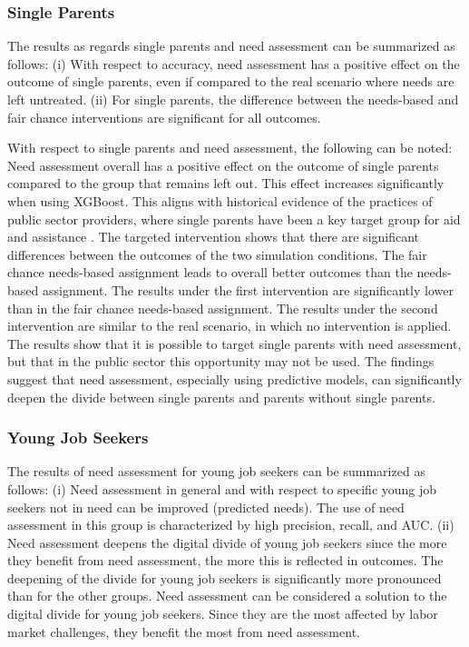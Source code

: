 \documentclass{article} %
\begin{document}
\subsubsection{Single Parents}
\label{sec:results_singles}
The results as regards single parents and need assessment can be summarized as follows: (i) With respect to accuracy, need assessment has a positive effect on the outcome of single parents, even if compared to the real scenario where needs are left untreated. (ii) For single parents, the difference between the needs-based and fair chance interventions are significant for all outcomes.

With respect to single parents and need assessment, the following can be noted: Need assessment overall has a positive effect on the outcome of single parents compared to the group that remains left out. This effect increases significantly when using XGBoost. This aligns with historical evidence of the practices of public sector providers, where single parents have been a key target group for aid and assistance \citep{Kallus03042021, wirtz2019artificial}. The targeted intervention shows that there are significant differences between the outcomes of the two simulation conditions. The fair chance needs-based assignment leads to overall better outcomes than the needs-based assignment. The results under the first intervention are significantly lower than in the fair chance needs-based assignment. The results under the second intervention are similar to the real scenario, in which no intervention is applied. The results show that it is possible to target single parents with need assessment, but that in the public sector this opportunity may not be used. The findings suggest that need assessment, especially using predictive models, can significantly deepen the divide between single parents and parents without single parents.

\subsubsection{Young Job Seekers}
\label{sec:results_young}
The results of need assessment for young job seekers can be summarized as follows: (i) Need assessment in general and with respect to specific young job seekers not in need can be improved (predicted needs). The use of need assessment in this group is characterized by high precision, recall, and AUC. (ii) Need assessment deepens the digital divide of young job seekers since the more they benefit from need assessment, the more this is reflected in outcomes. The deepening of the divide for young job seekers is significantly more pronounced than for the other groups. Need assessment can be considered a solution to the digital divide for young job seekers. Since they are the most affected by labor market challenges, they benefit the most from need assessment.
\end{document}
